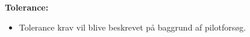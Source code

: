 \textbf{Tolerance:}
\begin{itemize}
\item Tolerance krav vil blive beskrevet på baggrund af pilotforsøg.
\end{itemize}

